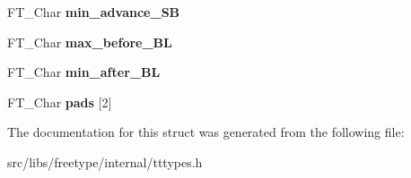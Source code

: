 \begin{DoxyCompactItemize}
\item 
\hypertarget{struct_t_t___s_bit___line_metrics_rec___ad4f4578a99ce4537bd454bf47a60074c}{
FT\_\-Char {\bfseries min\_\-advance\_\-SB}}
\label{struct_t_t___s_bit___line_metrics_rec___ad4f4578a99ce4537bd454bf47a60074c}

\item 
\hypertarget{struct_t_t___s_bit___line_metrics_rec___a63599b9adfc64d1927b6a8b46d9ce08d}{
FT\_\-Char {\bfseries max\_\-before\_\-BL}}
\label{struct_t_t___s_bit___line_metrics_rec___a63599b9adfc64d1927b6a8b46d9ce08d}

\item 
\hypertarget{struct_t_t___s_bit___line_metrics_rec___a553dfe17d98fd138430545f4f77195c5}{
FT\_\-Char {\bfseries min\_\-after\_\-BL}}
\label{struct_t_t___s_bit___line_metrics_rec___a553dfe17d98fd138430545f4f77195c5}

\item 
\hypertarget{struct_t_t___s_bit___line_metrics_rec___a9f98e5de39f252b6ebfb3e94120d1dbc}{
FT\_\-Char {\bfseries pads} \mbox{[}2\mbox{]}}
\label{struct_t_t___s_bit___line_metrics_rec___a9f98e5de39f252b6ebfb3e94120d1dbc}

\end{DoxyCompactItemize}


The documentation for this struct was generated from the following file:\begin{DoxyCompactItemize}
\item 
src/libs/freetype/internal/tttypes.h\end{DoxyCompactItemize}
